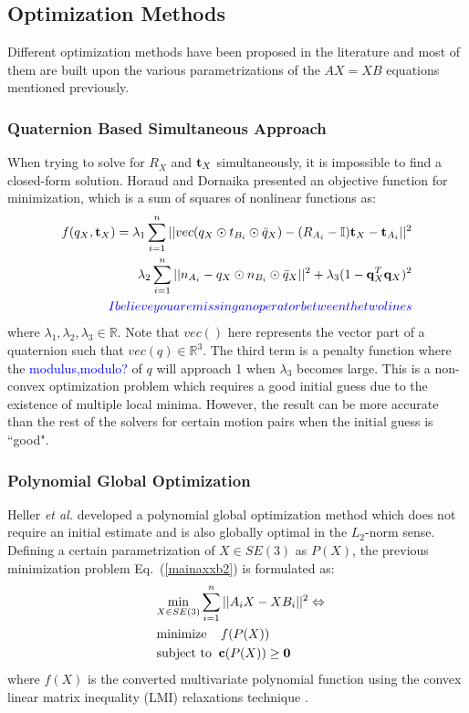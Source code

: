 \documentclass[twocolumn,10pt]{asme2ej}
\newcommand{\ttt}{{\bf t}}
\newcommand{\qq}{{\bf q}}
\begin{document}
\subsection{Optimization Methods}
\label{sec:optimization}
Different optimization methods have been proposed in the literature and most of them are built upon the various parametrizations of the $AX=XB$ equations mentioned previously. 
\subsubsection{Quaternion Based Simultaneous Approach}
When trying to solve for $R_{X}$ and $\ttt_{X}$ simultaneously, it is impossible to find a closed-form solution. Horaud and Dornaika \cite{horaud1995hand} presented an objective function for minimization, which is a sum of squares of nonlinear functions as:
\begin{equation}
\begin{split}
f(q_X,\ttt_{X}) = \lambda_{1} \sum_{i = 1}^{n}||vec(q_{X} \odot t_{B_{i}} \odot \bar{q}_{X}) -(R_{A_i} - \mathbb{I})\ttt_{X} - \ttt_{A_i}||^{2}\\
\lambda_{2} \sum_{i = 1}^{n}||{n_{A_{i}} - q_{X} \odot n_{B_{i}} \odot \bar{q}_{X}}||^{2} + \lambda_{3}(1 - \qq_{X}^{T}\qq_{X})^2\\
\textcolor{blue}{I believe you are missing an operator between the two lines} 
\end{split}
\label{simlqua}
\end{equation}
where $\lambda_1, \lambda_2, \lambda_3 \in \mathbb{R}$. Note that $vec()$ here represents the vector part of a quaternion such that $vec(q) \in \mathbb{R}^{3}$. The third term is a penalty function where the \textcolor{blue}{modulus,modulo?} %
of $q$ will approach 1 when $\lambda_{3}$ becomes large. This is a non-convex optimization problem which requires a good initial guess due to the existence of multiple local minima. However, the result can be more accurate than the rest of the solvers for certain motion pairs when the initial guess is ``good".

\subsubsection{Polynomial Global Optimization}
Heller {\it et al.} \cite{heller2014hand} developed a polynomial global optimization method which does not require an initial estimate and is also globally optimal in the $L_2$-norm sense. Defining a certain parametrization of $X \in SE(3)$ as $P(X)$, the previous minimization problem Eq.~(\ref{mainaxxb2}) is formulated as:
\begin{equation}
\begin{split}
&\underset{X \in SE(3)}{\text{min}}\sum_{i=1}^n ||A_{i}X - XB_{i}||^2 \Leftrightarrow \\
&\text{minimize} \; \; \; \; f(P(X)) \\
\; \; &\text{subject to} \; \; {\bf c}(P(X)) \geq {\bf 0} 
\end{split}
\label{LMI}
\end{equation}
where $f(X)$ is the converted multivariate polynomial function using the convex linear matrix inequality (LMI) relaxations technique \cite{lepetit2009epnp}. 
\end{document}
